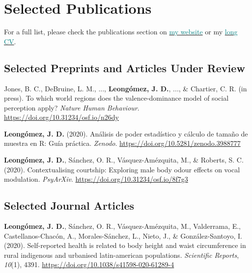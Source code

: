 \documentclass[11pt, a4paper]{awesome-cv}
\begin{document}
\hypertarget{selected-publications}{%
\section{Selected Publications}\label{selected-publications}}

For a full list, please check the publications section on
\href{https://jdleongomez.info/en/publication/}{\textcolor{teal}{my website}}
or my
\href{https://jdleongomez.info/en/files/jdl_cv_en.pdf}{\textcolor{teal}{long CV}}.

\hypertarget{selected-preprints-and-articles-under-review}{%
\subsection{Selected Preprints and Articles Under
Review}\label{selected-preprints-and-articles-under-review}}

\begingroup
\setlength{\parindent}{-0.5in}
\setlength{\leftskip}{0.5in}

\hypertarget{refs_featured_preprint}{}
\leavevmode\hypertarget{ref-Jones2018}{}%
Jones, B. C., DeBruine, L. M., ..., \textbf{Leongómez, J. D.}, ..., \&
Chartier, C. R. (in press). {To which world regions does the
valence-dominance model of social perception apply?} \emph{Nature Human
Behaviour}. \url{https://doi.org/10.31234/osf.io/n26dy}

\leavevmode\hypertarget{ref-Leongomez2020a}{}%
\textbf{Leongómez, J. D.} (2020). {Análisis de poder estadístico y
cálculo de tamaño de muestra en R: Guía práctica}. \emph{Zenodo}.
\url{https://doi.org/10.5281/zenodo.3988777}

\leavevmode\hypertarget{ref-Leongomez2020}{}%
\textbf{Leongómez, J. D.}, Sánchez, O. R., Vásquez-Amézquita, M., \&
Roberts, S. C. (2020). Contextualising courtship: Exploring male body
odour effects on vocal modulation. \emph{PsyArXiv}.
\url{https://doi.org/10.31234/osf.io/8f7g3}

\endgroup

\hypertarget{selected-journal-articles}{%
\subsection{Selected Journal Articles}\label{selected-journal-articles}}

\begingroup
\setlength{\parindent}{-0.5in}
\setlength{\leftskip}{0.5in}

\hypertarget{refs_featured}{}
\leavevmode\hypertarget{ref-Leonguxf3mez2020}{}%
\textbf{Leongómez, J. D.}, Sánchez, O. R., Vásquez-Amézquita, M.,
Valderrama, E., Castellanos-Chacón, A., Morales-Sánchez, L., Nieto, J.,
\& González-Santoyo, I. (2020). Self-reported health is related to body
height and waist circumference in rural indigenous and urbanised
latin-american populations. \emph{Scientific Reports}, \emph{10}(1),
4391. \url{https://doi.org/10.1038/s41598-020-61289-4}
\end{document}
